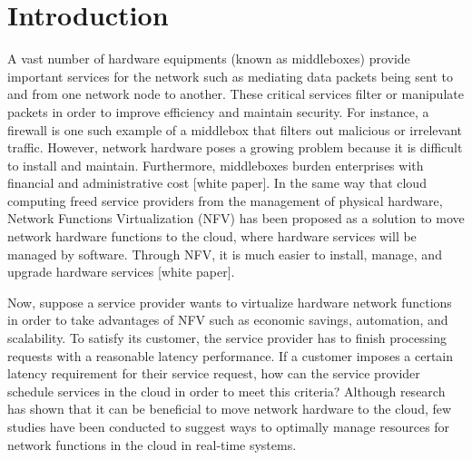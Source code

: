 \documentclass{sig-alternate}
\begin{document}
\section{Introduction}
\label{sec:intro}
	A vast number of hardware equipments (known as middleboxes) provide important services for the network such as mediating data packets being sent to and from one network node to another. These critical services filter or manipulate packets in order to improve efficiency and maintain security. For instance, a firewall is one such example of a middlebox that filters out malicious or irrelevant traffic. However, network hardware poses a growing problem because it is difficult to install and maintain. Furthermore, middleboxes burden enterprises with financial and administrative cost [white paper]. In the same way that cloud computing freed service providers from the management of physical hardware, Network Functions Virtualization (NFV) has been proposed as a solution to move network hardware functions to the cloud, where hardware services will be managed by software. Through NFV, it is much easier to install, manage, and upgrade hardware services [white paper].


	Now, suppose a service provider wants to virtualize hardware network functions in order to take advantages of NFV such as economic savings, automation, and scalability. To satisfy its customer, the service provider has to finish processing requests with a reasonable latency performance. If a customer imposes a certain latency requirement for their service request, how can the service provider schedule services in the cloud in order to meet this criteria? Although research has shown that it can be beneficial to move network hardware to the cloud, few studies have been conducted to suggest ways to optimally manage resources for network functions in the cloud in real-time systems.
\end{document}
